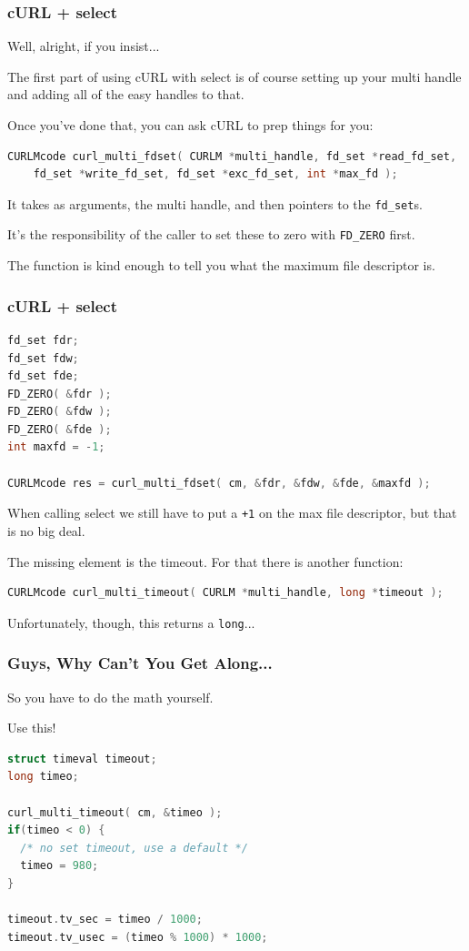 \begin{frame}[fragile]
	\frametitle{cURL + select}

	Well, alright, if you insist...

	The first part of using cURL with select is of course setting up your multi handle and adding all of the easy handles to that.

	Once you've done that, you can ask cURL to prep things for you:

	\begin{lstlisting}[language=C]
CURLMcode curl_multi_fdset( CURLM *multi_handle, fd_set *read_fd_set,
    fd_set *write_fd_set, fd_set *exc_fd_set, int *max_fd );
\end{lstlisting}

	It takes as arguments, the multi handle, and then pointers to the \texttt{fd\_set}s.

	It's the responsibility of the caller to set these to zero with \texttt{FD\_ZERO} first.

	The function is kind enough to tell you what the maximum file descriptor is.

\end{frame}

\begin{frame}[fragile]
	\frametitle{cURL + select}

	\begin{lstlisting}[language=C]
fd_set fdr;
fd_set fdw;
fd_set fde;
FD_ZERO( &fdr );
FD_ZERO( &fdw );
FD_ZERO( &fde );
int maxfd = -1;

CURLMcode res = curl_multi_fdset( cm, &fdr, &fdw, &fde, &maxfd );
\end{lstlisting}

	When calling select we still have to put a \texttt{+1} on the max file descriptor, but that is no big deal.

	The missing element is the timeout. For that there is another function:

	\begin{lstlisting}[language=C]
CURLMcode curl_multi_timeout( CURLM *multi_handle, long *timeout );
\end{lstlisting}

	Unfortunately, though, this returns a \texttt{long}...

\end{frame}


\begin{frame}[fragile]
	\frametitle{Guys, Why Can't You Get Along...}

	So you have to do the math yourself.

	Use this!

	\begin{lstlisting}[language=C]
struct timeval timeout;
long timeo;
 
curl_multi_timeout( cm, &timeo );
if(timeo < 0) {
  /* no set timeout, use a default */
  timeo = 980;
}
 
timeout.tv_sec = timeo / 1000;
timeout.tv_usec = (timeo % 1000) * 1000;
\end{lstlisting}

\end{frame}


